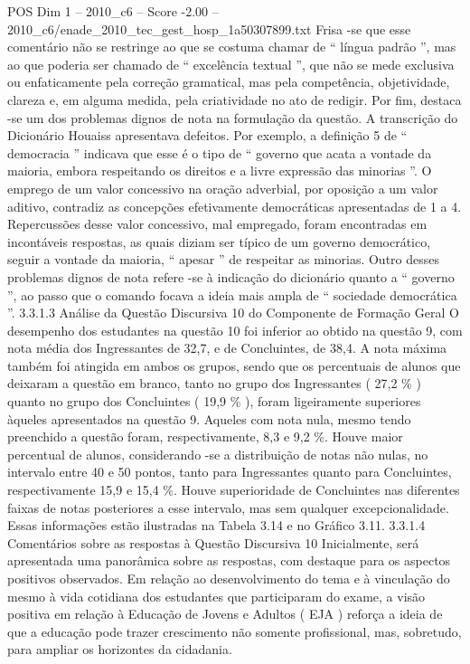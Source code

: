 \begin{textsample}{POS Dim 1 – 2010\_c6 – Score -2.00 – 2010\_c6/enade\_2010\_tec\_gest\_hosp\_1a50307899.txt}
Frisa -se que esse comentário não se restringe ao que se costuma chamar de “ língua padrão ”, mas ao que poderia ser chamado de “ excelência textual ”, que não se mede exclusiva ou enfaticamente pela correção gramatical, mas pela competência, objetividade, clareza e, em alguma medida, pela criatividade no ato de redigir.
Por fim, destaca -se um dos problemas dignos de nota na formulação da questão.
A transcrição do Dicionário Houaiss apresentava defeitos.
Por exemplo, a definição 5 de “ democracia ” indicava que esse é o tipo de “ governo que acata a vontade da maioria, embora respeitando os direitos e a livre expressão das minorias ”.
O emprego de um valor concessivo na oração adverbial, por oposição a um valor aditivo, contradiz as concepções efetivamente democráticas apresentadas de 1 a 4.
Repercussões desse valor concessivo, mal empregado, foram encontradas em incontáveis respostas, as quais diziam ser típico de um governo democrático, seguir a vontade da maioria, “ apesar ” de respeitar as minorias.
Outro desses problemas dignos de nota refere -se à indicação do dicionário quanto a “ governo ”, ao passo que o comando focava a ideia mais ampla de “ sociedade democrática ”. 3.3.1.3 Análise da Questão Discursiva 10 do Componente de Formação Geral O desempenho dos estudantes na questão 10 foi inferior ao obtido na questão 9, com nota média dos Ingressantes de 32,7, e de Concluintes, de 38,4.
A nota máxima também foi atingida em ambos os grupos, sendo que os percentuais de alunos que deixaram a questão em branco, tanto no grupo dos Ingressantes ( 27,2 \% ) quanto no grupo dos Concluintes ( 19,9 \% ), foram ligeiramente superiores àqueles apresentados na questão 9.
Aqueles com nota nula, mesmo tendo preenchido a questão foram, respectivamente, 8,3 e 9,2 \%.
Houve maior percentual de alunos, considerando -se a distribuição de notas não nulas, no intervalo entre 40 e 50 pontos, tanto para Ingressantes quanto para Concluintes, respectivamente 15,9 e 15,4 \%.
Houve superioridade de Concluintes nas diferentes faixas de notas posteriores a esse intervalo, mas sem qualquer excepcionalidade.
Essas informações estão ilustradas na Tabela 3.14 e no Gráfico 3.11. 3.3.1.4 Comentários sobre as respostas à Questão Discursiva 10 Inicialmente, será apresentada uma panorâmica sobre as respostas, com destaque para os aspectos positivos observados.
Em relação ao desenvolvimento do tema e à vinculação do mesmo à vida cotidiana dos estudantes que participaram do exame, a visão positiva em relação à Educação de Jovens e Adultos ( EJA ) reforça a ideia de que a educação pode trazer crescimento não somente profissional, mas, sobretudo, para ampliar os horizontes da cidadania.

\end{textsample}
